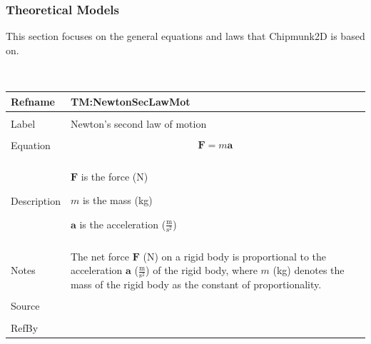 \documentclass[12pt]{article}
\begin{document}
\subsubsection{Theoretical Models}
\label{Sec:TMs}
This section focuses on the general equations and laws that Chipmunk2D is based on.
\par~

\noindent \begin{minipage}{\textwidth}
\begin{tabular}{p{} p{}}
\toprule \textbf{Refname} & \textbf{TM:NewtonSecLawMot}
\label{TM:NewtonSecLawMot}
\\ \midrule \\
Label & Newton's second law of motion
        \\ \midrule \\
        Equation & \begin{displaymath}
                   \mathbf{F}=m \mathbf{a}
                   \end{displaymath}
                   \\ \midrule \\
                   Description & \begin{symbDescription}
                                 \item{$\mathbf{F}$ is the force (N)}
                                 \item{$m$ is the mass (kg)}
                                 \item{$\mathbf{a}$ is the acceleration ($\frac{\text{m}}{\text{s}^{2}}$)}
                                 \end{symbDescription}
                                 \\ \midrule \\
                                 Notes & The net force $\mathbf{F}$ (N) on a rigid body is proportional to the acceleration $\mathbf{a}$ ($\frac{\text{m}}{\text{s}^{2}}$) of the rigid body, where $m$ (kg) denotes the mass of the rigid body as the constant of proportionality.
                                         \\ \midrule \\
                                         Source & \\ \midrule \\
                                                  RefBy & 
\\ \bottomrule \end{tabular}
\end{minipage}
\par~
\end{document}
